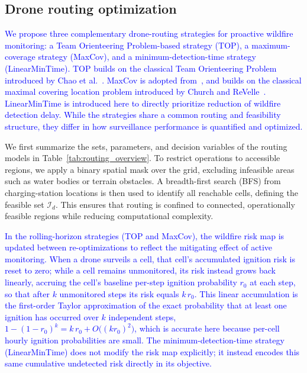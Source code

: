 \documentclass[pdflatex,sn-mathphys-num]{sn-jnl}%
\theoremstyle{thmstyleone}%
\theoremstyle{thmstyletwo}%
\theoremstyle{thmstylethree}%
\newcommand{\blue}[1]{\textcolor{blue}{#1}}
\newcommand{\set}[1]{\mathcal{#1}}
\begin{document}
\subsection*{Drone routing optimization}
\blue{We propose three complementary drone-routing strategies for proactive wildfire monitoring: a Team Orienteering Problem-based strategy (TOP),  a maximum-coverage strategy (MaxCov), and a minimum-detection-time strategy (LinearMinTime). TOP builds on the classical Team Orienteering Problem introduced by Chao et al.~\cite{chao1996team}. MaxCov is adopted from~\cite{dronebench2025}, and builds on the classical maximal covering location problem introduced by Church and ReVelle~\cite{MCLPChurchRevelle}. LinearMinTime is introduced here to directly prioritize reduction of wildfire detection delay. While the strategies share a common routing and feasibility structure, they differ in how surveillance performance is quantified and optimized.}

We first summarize the sets, parameters, and decision variables of the routing models in Table~\ref{tab:routing_overview}. To restrict operations to accessible regions, we apply a binary spatial mask over the grid, excluding infeasible areas such as water bodies or terrain obstacles. A breadth-first search (BFS) from charging-station locations is then used to identify all reachable cells, defining the feasible set $\set I_d$. This ensures that routing is confined to connected, operationally feasible regions while reducing computational complexity.

\blue{In the rolling-horizon strategies (TOP and MaxCov), the wildfire risk map is updated between re-optimizations to reflect the mitigating effect of active monitoring. When a drone surveils a cell, that cell's accumulated ignition risk is reset to zero; while a cell remains unmonitored, its risk instead grows back linearly, accruing the cell's baseline per-step ignition probability $r_0$ at each step, so that after $k$ unmonitored steps its risk equals $k\,r_0$. This linear accumulation is the first-order Taylor approximation of the exact probability that at least one ignition has occurred over $k$ independent steps, $1-(1-r_0)^k = k\,r_0 + O\!\big((k r_0)^2\big)$, which is accurate here because per-cell hourly ignition probabilities are small. The minimum-detection-time strategy (LinearMinTime) does not modify the risk map explicitly; it instead encodes this same cumulative undetected risk directly in its objective.}
\end{document}
